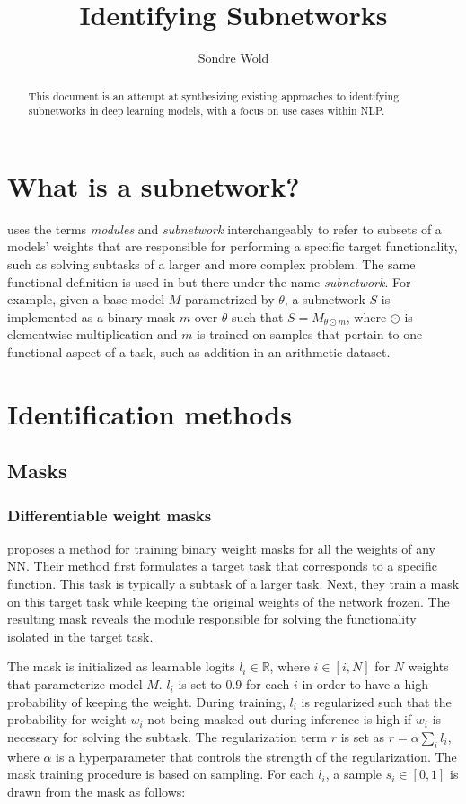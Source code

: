 \documentclass[11pt]{article}
\title{Identifying Subnetworks}
\author{Sondre Wold}
\begin{document}
\maketitle

\begin{abstract}
\noindent
This document is an attempt at synthesizing existing approaches to identifying subnetworks in deep learning models, with a focus on use cases within NLP.
\end{abstract}

\section{What is a subnetwork?}

\citet{csordas2020neural} uses the terms \textit{modules} and \textit{subnetwork} interchangeably to refer to subsets of a models' weights that are responsible for performing a specific target functionality, such as solving subtasks of a larger and more complex problem. The same functional definition is used in \citet{lepori2023break} but there under the name \textit{subnetwork}. For example, given a base model $M$ parametrized by $\theta$, a subnetwork $S$ is implemented as a binary mask $m$ over $\theta$ such that $S=M_{\theta \odot m}$, where $\odot$ is elementwise multiplication and $m$ is trained on samples that pertain to one functional aspect of a task, such as addition in an arithmetic dataset.

\section{Identification methods}
\subsection{Masks}
\subsubsection{Differentiable weight masks}
\citet{csordas2020neural} proposes a method for training binary weight masks for all the weights of any NN. Their method first formulates a target task that corresponds to a specific function. This task is typically a subtask of a larger task. Next, they train a mask on this target task while keeping the original weights of the network frozen. The resulting mask reveals the module responsible for solving the functionality isolated in the target task.

The mask is initialized as learnable logits $l_i \in \mathbb{R}$, where $i \in [i, N]$ for $N$ weights that parameterize model $M$. $l_i$ is set to $0.9$ for each $i$ in order to have a high probability of keeping the weight. During training, $l_i$ is regularized such that the probability for weight $w_i$ not being masked out during inference is high if $w_i$ is necessary for solving the subtask. The regularization term $r$ is set as $r = \alpha \sum_i l_i$, where $\alpha$ is a hyperparameter that controls the strength of the regularization. The mask training procedure is based on sampling. For each $l_i$, a sample $s_i \in [0, 1]$ is drawn from the mask as follows:
\end{document}
